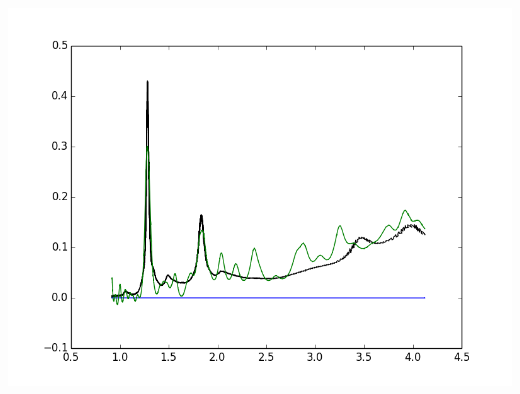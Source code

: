 \documentclass{article}
\begin{document}
\includegraphics{"(8,3) ATPE DNA Paper.png"}
\end{document}
